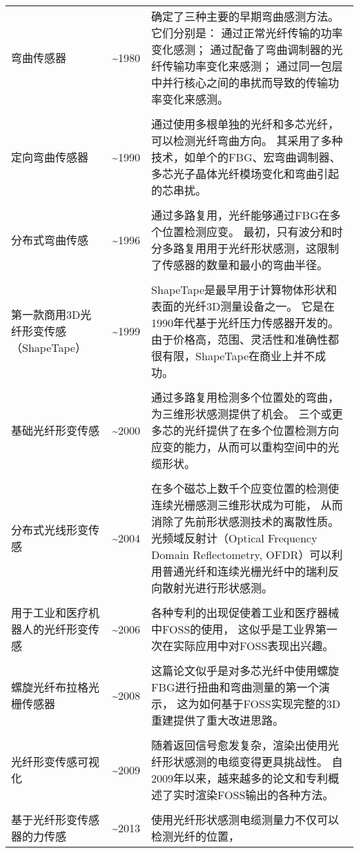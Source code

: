 \begin{table}[!htbp]
\begin{center}
\begin{tabular}{p{}cp{}}
弯曲传感器 & \textasciitilde 1980 & 确定了三种主要的早期弯曲感测方法。它们分别是：
通过正常光纤传输的功率变化感测；
通过配备了弯曲调制器的光纤传输功率变化来感测；
通过同一包层中并行核心之间的串扰而导致的传输功率变化来感测。
\\
\\
定向弯曲传感器 & \textasciitilde 1990 & 通过使用多根单独的光纤和多芯光纤，可以检测光纤弯曲方向。
其采用了多种技术，如单个的FBG、宏弯曲调制器、多芯光子晶体光纤模场变化和弯曲引起的芯串扰。
\\
\\
分布式弯曲传感 & \textasciitilde 1996 & 通过多路复用，光纤能够通过FBG在多个位置检测应变。 
最初，只有波分和时分多路复用用于光纤形状感测，这限制了传感器的数量和最小的弯曲半径。
\\
\\
第一款商用3D光纤形变传感（ShapeTape）& \textasciitilde 1999 & ShapeTape是最早用于计算物体形状和表面的光纤3D测量设备之一。 
它是在1990年代基于光纤压力传感器开发的。 
由于价格高，范围、灵活性和准确性都很有限，ShapeTape在商业上并不成功。
\\
\\
基础光纤形变传感 & \textasciitilde 2000 & 通过多路复用检测多个位置处的弯曲，为三维形状感测提供了机会。
三个或更多芯的光纤提供了在多个位置检测方向应变的能力，从而可以重构空间中的光缆形状。
\\
\\
分布式光线形变传感 & \textasciitilde 2004 & 在多个磁芯上数千个应变位置的检测使连续光栅感测三维形状成为可能，
从而消除了先前形状感测技术的离散性质。 
光频域反射计（Optical Frequency Domain Reflectometry, OFDR）可以利用普通光纤和连续光栅光纤中的瑞利反向散射光进行形状感测。
\\
\\
用于工业和医疗机器人的光纤形变传感 & \textasciitilde 2006 & 各种专利的出现促使着工业和医疗器械中FOSS的使用，
这似乎是工业界第一次在实际应用中对FOSS表现出兴趣。
\\
\\
螺旋光纤布拉格光栅传感器 & \textasciitilde 2008 & 这篇论文似乎是对多芯光纤中使用螺旋FBG进行扭曲和弯曲测量的第一个演示，
这为如何基于FOSS实现完整的3D重建提供了重大改进思路。
\\
\\
光纤形变传感可视化 & \textasciitilde 2009 & 随着返回信号愈发复杂，渲染出使用光纤形状感测的电缆变得更具挑战性。
自2009年以来，越来越多的论文和专利概述了实时渲染FOSS输出的各种方法。
\\
\\
基于光纤形变传感器的力传感 & \textasciitilde 2013 & 使用光纤形状感测电缆测量力不仅可以检测光纤的位置，

\end{tabular}
\end{center}
\end{table}

